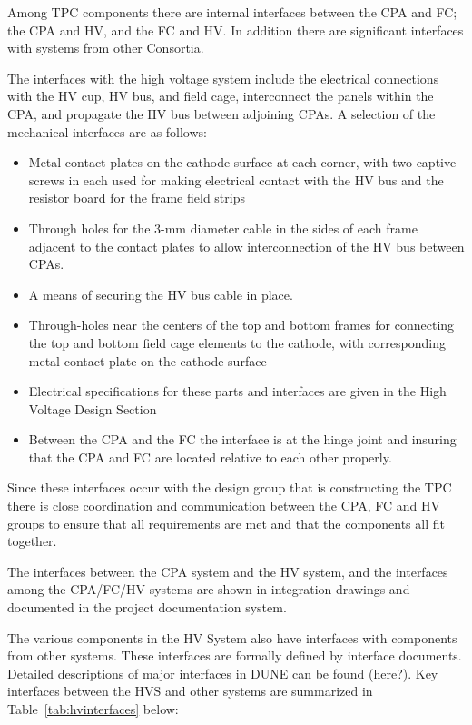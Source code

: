 Among TPC components there are internal interfaces between the CPA and FC; the CPA and HV, and  the FC and HV. In addition there are significant interfaces with systems from other Consortia.

The interfaces with the high voltage system include the electrical connections with the HV cup, HV bus, and field cage, interconnect the panels within the CPA, and propagate the HV bus between adjoining CPAs.  A selection of the mechanical interfaces are as follows:
\begin{itemize}
\item Metal contact plates on the cathode surface at each corner, with two captive screws in each used for making electrical contact with the HV bus and the resistor board for the frame field strips
\item Through holes for the 3-mm diameter cable in the sides of each frame adjacent to the contact plates to allow interconnection of the HV bus between CPAs.
\item A means of securing the HV bus cable in place.
\item Through-holes near the centers of the top and bottom frames for connecting the top and bottom field cage elements to the cathode, with corresponding metal contact plate on the cathode surface
\item Electrical specifications for these parts and interfaces are given in the High Voltage Design Section
\item Between the CPA and the FC the interface is at the hinge joint and insuring that the CPA and FC are located relative to each other properly.
\end{itemize}

Since these interfaces occur with the design group that is constructing the TPC there is close coordination and communication between the CPA, FC and HV groups to ensure that all requirements are met and that the components all fit together.  

The interfaces between the CPA system and the HV system, and the interfaces among the CPA/FC/HV systems are shown in integration drawings and documented in the project documentation system.


The various components in the HV System also have interfaces with components from other systems.  These interfaces are formally defined by interface documents. Detailed descriptions of major interfaces in DUNE can be found (here?). Key interfaces between the HVS and other systems are summarized in Table~{\ref{tab:hvinterfaces}} below:

